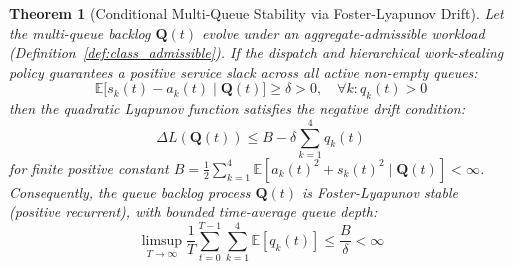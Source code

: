 \documentclass[conference]{IEEEtran}
\newtheorem{theorem}{Theorem}
\begin{document}
\begin{theorem}[Conditional Multi-Queue Stability via Foster-Lyapunov Drift]
\label{thm:stability}
Let the multi-queue backlog $\mathbf{Q}(t)$ evolve under an aggregate-admissible workload (Definition~\ref{def:class_admissible}). If the dispatch and hierarchical work-stealing policy guarantees a positive service slack across all active non-empty queues:
\begin{equation}
\label{eq:slack_cond}
\mathbb{E}\big[ s_k(t) - a_k(t) \;\big|\; \mathbf{Q}(t) \big] \ge \delta > 0, \quad \forall k: q_k(t) > 0
\end{equation}
then the quadratic Lyapunov function satisfies the negative drift condition:
\begin{equation}
\label{eq:negative_drift}
\Delta L(\mathbf{Q}(t)) \le B - \delta \sum_{k=1}^4 q_k(t)
\end{equation}
for finite positive constant $B = \frac{1}{2} \sum_{k=1}^4 \mathbb{E}[a_k(t)^2 + s_k(t)^2 \mid \mathbf{Q}(t)] < \infty$. Consequently, the queue backlog process $\mathbf{Q}(t)$ is Foster-Lyapunov stable (positive recurrent), with bounded time-average queue depth:
\begin{equation}
\limsup_{T \to \infty} \frac{1}{T} \sum_{t=0}^{T-1} \sum_{k=1}^4 \mathbb{E}[q_k(t)] \le \frac{B}{\delta} < \infty
\end{equation}
\end{theorem}
\end{document}
